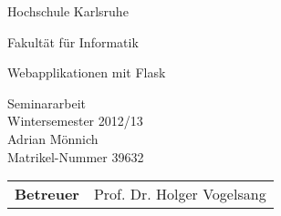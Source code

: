 \thispagestyle{empty}

\begin{center}
\begin{Huge}
Hochschule Karlsruhe\\
\vspace{3mm}
\end{Huge}{\Large Fakultät für Informatik}\\

\vspace{20mm}
\begin{Large}
Webapplikationen mit Flask\\
\end{Large}
\vspace{8mm}
Seminararbeit\\
Wintersemester 2012/13\\
\vspace{0.4cm}
\vspace{2 cm}
Adrian Mönnich \\
Matrikel-Nummer 39632\\
\vspace{8cm}
\begin{tabular}{ll}
{\bf Betreuer} & Prof. Dr. Holger Vogelsang\\
\end{tabular}

\end{center}
\clearpage
